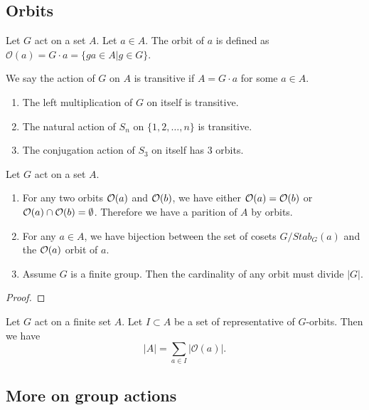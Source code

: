\subsection{Orbits}
\begin{defi}
    Let $G$ act on a set $A$. Let $a \in A$. The orbit of $a$ is defined as $\mathcal{O}(a) = G \cdot a = \{g a \in A \vert g \in G\}$.

    We say the action of $G$ on $A$ is transitive if $A = G \cdot a$ for some $a \in A$.
\end{defi}

\begin{example}
    \begin{enumerate}
        \item The left multiplication of $G$ on itself is transitive.
        \item The natural action of $S_n$ on $\{1,2, \dots, n\}$ is transitive.
        \item The conjugation action of $S_3$ on itself has $3$ orbits.
    \end{enumerate}
\end{example}

\begin{lem}Let $G$ act on a set $A$.
    \begin{enumerate}
        \item For any two orbits $\mathcal {O}(a)$ and $\mathcal {O}(b)$, we have either  $\mathcal {O}(a) = \mathcal {O}(b)$ or $\mathcal {O}(a) \cap \mathcal {O}(b) = \emptyset$. Therefore we have a parition of $A$ by orbits.
        \item For any $a \in A$, we have bijection between the set of cosets $G/ Stab_{G}(a)$ and the $\mathcal {O}(a)$ orbit of $a$.
        \item Assume $G$ is a finite group. Then the cardinality of any orbit must divide $|G|$.
    \end{enumerate}
\end{lem}

\begin{proof}
\end{proof}

\begin{cor}
    Let $G$ act on a finite set $A$. Let $I \subset A$ be a set of representative of $G$-orbits. Then we have
    \[
        | A | = \sum_{a \in I} | \mathcal{O}(a)|.
    \]
\end{cor}


\subsection{More on group actions}



